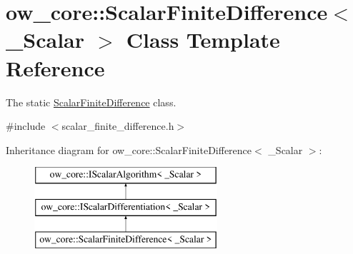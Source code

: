 \hypertarget{classow__core_1_1ScalarFiniteDifference}{}\section{ow\+\_\+core\+:\+:Scalar\+Finite\+Difference$<$ \+\_\+\+Scalar $>$ Class Template Reference}
\label{classow__core_1_1ScalarFiniteDifference}


The static \hyperlink{classow__core_1_1ScalarFiniteDifference}{Scalar\+Finite\+Difference} class.  




{\ttfamily \#include $<$scalar\+\_\+finite\+\_\+difference.\+h$>$}

Inheritance diagram for ow\+\_\+core\+:\+:Scalar\+Finite\+Difference$<$ \+\_\+\+Scalar $>$\+:\begin{figure}[H]
\begin{center}
\leavevmode
\includegraphics[height=3.000000cm]{d6/d94/classow__core_1_1ScalarFiniteDifference}
\end{center}
\end{figure}
